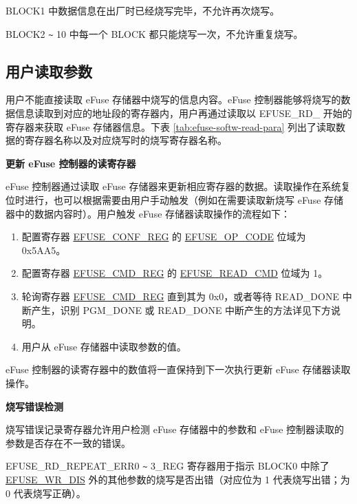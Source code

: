 \documentclass[main\_\_CN.tex]{subfiles}
\begin{document}
BLOCK1 中数据信息在出厂时已经烧写完毕，不允许再次烧写。

BLOCK2 \verb+~+ 10 中每一个 BLOCK 都只能烧写一次，不允许重复烧写。

\subsection{用户读取参数}
\label{sec:efuse-software-read-para}

用户不能直接读取 eFuse 存储器中烧写的信息内容。eFuse 控制器能够将烧写的数据信息读取到对应的地址段的寄存器内，用户再通过读取以 EFUSE\_RD\_ 开始的寄存器来获取 eFuse 存储器信息。下表 \ref{tab:efuse-softw-read-para} 列出了读取数据的寄存器名称以及对应烧写时的烧写寄存器名称。



{\bfseries 更新 eFuse 控制器的读寄存器}
\label{sec:efuse-update-reg}

eFuse 控制器通过读取 eFuse 存储器来更新相应寄存器的数据。读取操作在系统复位时进行，也可以根据需要由用户手动触发（例如在需要读取新烧写 eFuse 存储器中的数据内容时）。用户触发 eFuse 存储器读取操作的流程如下：

\begin{enumerate}
    \item 配置寄存器 \hyperref[regdesc:EFUSECONFREG]{EFUSE\_CONF\_REG} 的 \hyperref[fielddesc:EFUSEOPCODE]{EFUSE\_OP\_CODE} 位域为 0x5AA5。
    \item 配置寄存器 \hyperref[regdesc:EFUSECMDREG]{EFUSE\_CMD\_REG} 的 \hyperref[fielddesc:EFUSEREADCMD]{EFUSE\_READ\_CMD} 位域为 1。
    \item 轮询寄存器 \hyperref[regdesc:EFUSECMDREG]{EFUSE\_CMD\_REG} 直到其为 0x0，或者等待 READ\_DONE 中断产生，识别 PGM\_DONE 或 READ\_DONE 中断产生的方法详见下方说明。
    \item 用户从 eFuse 存储器中读取参数的值。
\end{enumerate}

eFuse 控制器的读寄存器中的数值将一直保持到下一次执行更新 eFuse 存储器读取操作。

{\bfseries 烧写错误检测}

烧写错误记录寄存器允许用户检测 eFuse 存储器中的参数和 eFuse 控制器读取的参数是否存在不一致的错误。

EFUSE\_RD\_REPEAT\_ERR0 \verb+~+ 3\_REG 寄存器用于指示 BLOCK0 中除了 \hyperref[fielddesc:EFUSEWRDIS]{EFUSE\_WR\_DIS} 外的其他参数的烧写是否出错（对应位为 1 代表烧写出错；为 0 代表烧写正确）。
\end{document}
